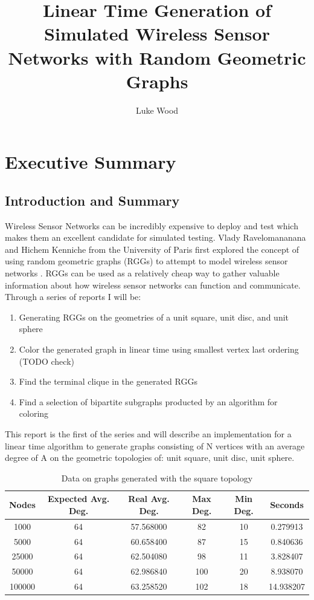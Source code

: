 \documentclass{article}
\begin{document}
  \title{Linear Time Generation of Simulated Wireless Sensor Networks with Random Geometric Graphs}
  \author{Luke Wood}
  \maketitle

  \section{Executive Summary}
  \subsection{Introduction and Summary}
	Wireless Sensor Networks can be incredibly expensive to deploy and test which makes them an excellent candidate for simulated testing.
	Vlady Ravelomananana and Hichem Kenniche from the University of Paris first explored the concept of using random geometric graphs (RGGs) to attempt to model wireless sensor networks \cite{kenniche2010random}.
	RGGs can be used as a relatively cheap way to gather valuable information about how wireless sensor networks can function and communicate.
	Through a series of reports	I will be:
	\begin{enumerate}
		\item Generating RGGs on the geometries of a unit square, unit disc, and unit sphere
		\item Color the generated graph in linear time using smallest vertex last ordering (TODO check)
		\item Find the terminal clique in the generated RGGs
		\item Find a selection of bipartite subgraphs producted by an algorithm for coloring
	\end{enumerate}
	This report is the first of the series and  will describe an implementation for a linear time algorithm to generate graphs consisting of N vertices with an average degree of A on the geometric topologies of: unit square, unit disc, unit sphere.

	\begin{center}
	  \begin{table}[H]
			\begin{tabular}{ |c|c|c|c|c|c| }
				\hline
				Nodes & Expected Avg. Deg. & Real Avg. Deg. & Max Deg. & Min Deg. & Seconds \\
        \hline
        1000 & 64 & 57.568000 & 82 & 10 & 0.279913 \\
        \hline
        5000 & 64 & 60.658400 & 87 & 15 & 0.840636 \\
        \hline
        25000 & 64 & 62.504080 & 98 & 11 & 3.828407 \\
        \hline
        50000 & 64 & 62.986840 & 100 & 20 & 8.938070 \\
        \hline
        100000 & 64 & 63.258520 & 102 & 18 & 14.938207 \\
        \hline

			\end{tabular}
			\caption{Data on graphs generated with the square topology}
		\end{table}
	\end{center}
\end{document}
